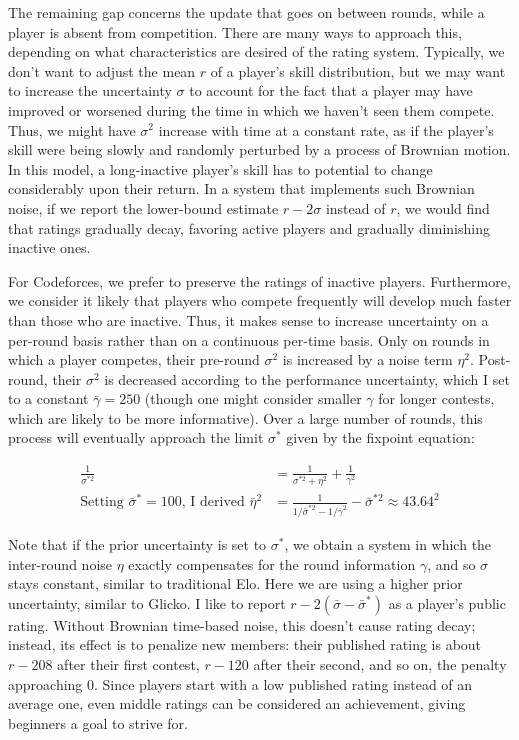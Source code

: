 \documentclass{article}
\begin{document}
The remaining gap concerns the update that goes on between rounds, while a player is absent from competition. There are many ways to approach this, depending on what characteristics are desired of the rating system. Typically, we don't want to adjust the mean $r$ of a player's skill distribution, but we may want to increase the uncertainty $\sigma$ to account for the fact that a player may have improved or worsened during the time in which we haven't seen them compete. Thus, we might have $\sigma^2$ increase with time at a constant rate, as if the player's skill were being slowly and randomly perturbed by a process of Brownian motion. In this model, a long-inactive player's skill has to potential to change considerably upon their return. In a system that implements such Brownian noise, if we report the lower-bound estimate $r-2\sigma$ instead of $r$, we would find that ratings gradually decay, favoring active players and gradually diminishing inactive ones.

For Codeforces, we prefer to preserve the ratings of inactive players. Furthermore, we consider it likely that players who compete frequently will develop much faster than those who are inactive. Thus, it makes sense to increase uncertainty on a per-round basis rather than on a continuous per-time basis. Only on rounds in which a player competes, their pre-round $\sigma^2$ is increased by a noise term $\eta^2$. Post-round, their $\sigma^2$ is decreased according to the performance uncertainty, which I set to a constant $\bar\gamma = 250$ (though one might consider smaller $\gamma$ for longer contests, which are likely to be more informative). Over a large number of rounds, this process will eventually approach the limit $\sigma^*$ given by the fixpoint equation:

\begin{align*}
\frac{1}{\sigma^{*2}} &= \frac{1}{\sigma^{*2} + \eta^2} + \frac{1}{\gamma^2}
\\ \text{Setting }\bar\sigma^*=100\text{, I derived }\bar\eta^2 &= \frac{1}{1/\bar\sigma^{*2} - 1/\bar\gamma^2} - \bar\sigma^{*2} \approx 43.64^2
\end{align*}

Note that if the prior uncertainty is set to $\sigma^*$, we obtain a system in which the inter-round noise $\eta$ exactly compensates for the round information $\gamma$, and so $\sigma$ stays constant, similar to traditional Elo. Here we are using a higher prior uncertainty, similar to Glicko. I like to report $r-2(\bar\sigma-\bar\sigma^*)$ as a player's public rating. Without Brownian time-based noise, this doesn't cause rating decay; instead, its effect is to penalize new members: their published rating is about $r - 208$ after their first contest, $r - 120$ after their second, and so on, the penalty approaching $0$. Since players start with a low published rating instead of an average one, even middle ratings can be considered an achievement, giving beginners a goal to strive for. 
\end{document}
